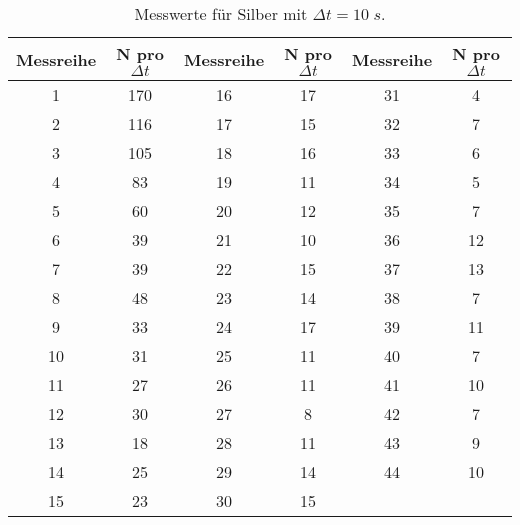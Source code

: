 \begin{table}[H]
  \centering
  \caption{Messwerte für Silber mit $\Delta t=10\;s $.}
  \label{tab:tab1}
    \begin{tabular}{c c c c c c}
    \toprule
    Messreihe & N pro $\Delta t$ & Messreihe & N pro $\Delta t$ & Messreihe & N pro $\Delta t$ \\
    \midrule
    1 & 170 & 16 & 17 & 31 & 4\\
    2 & 116 & 17 & 15 & 32 & 7\\
    3 & 105 & 18 & 16 & 33 & 6\\
    4 & 83 & 19 & 11 & 34 & 5\\
    5 & 60 & 20 & 12 & 35 & 7\\
    6 & 39 & 21 & 10 & 36 & 12\\
    7 & 39 & 22 & 15 & 37 & 13\\
    8 & 48 & 23 & 14 & 38 & 7\\
    9 & 33 & 24 & 17 & 39 & 11\\
    10 & 31 & 25 & 11 & 40 & 7\\
    11 & 27 & 26 & 11 & 41 & 10\\
    12 & 30 & 27 & 8 & 42 & 7\\
    13 & 18 & 28 & 11 & 43 & 9\\
    14 & 25 & 29 & 14 & 44 & 10\\
    15 & 23 & 30 & 15 &  & \\
    \bottomrule
    \end{tabular}
  \end{table}
